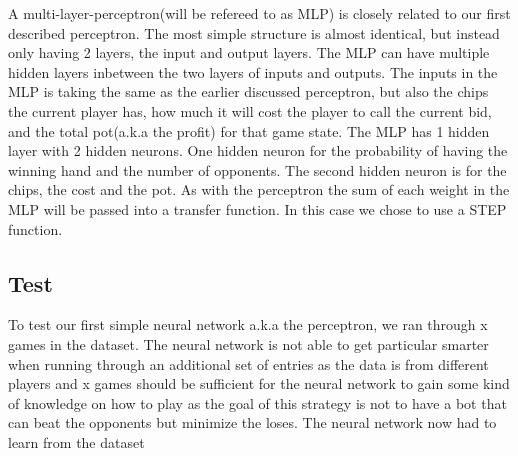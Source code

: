 A multi-layer-perceptron(will be refereed to as MLP) is closely related to our first described perceptron. The most simple structure is almost identical, but instead only having 2 layers, the input and output layers. The MLP can have multiple hidden layers inbetween the two layers of inputs and outputs.
The inputs in the MLP is taking the same as the earlier discussed perceptron, but also the chips the current player has, how much it will cost the player to call the current bid, and the total pot(a.k.a the profit) for that game state.
The MLP has 1 hidden layer with 2 hidden neurons. One hidden neuron for the probability of having the winning hand and the number of opponents. The second hidden neuron is for the chips, the cost and the pot.
As with the perceptron the sum of each weight in the MLP will be passed into a transfer function. In this case we chose to use a STEP function.





\subsection{Test}
To test our first simple neural network a.k.a the perceptron, we ran through x games in the dataset. The neural network is not able to get particular smarter when running through an additional set of entries as the data is from different players and x games should be sufficient for the neural network to gain some kind of knowledge on how to play as the goal of this strategy is not to have a bot that can beat the opponents but minimize the loses.
The neural network now had to learn from the dataset 
 


